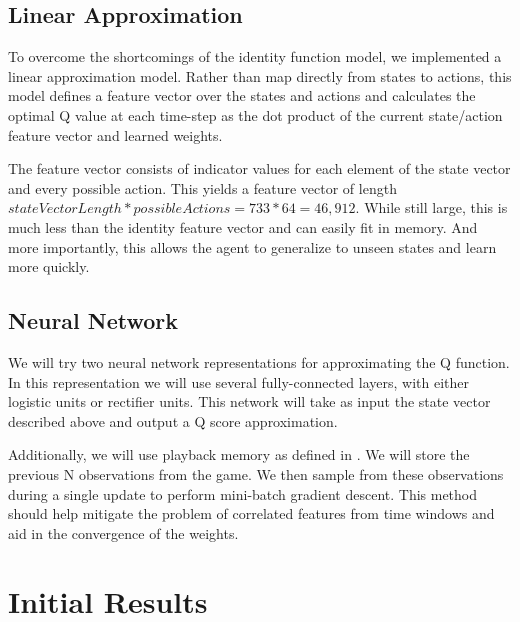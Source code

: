 \documentclass[12pt]{article}
\begin{document}
\subsection{Linear Approximation}

To overcome the shortcomings of the identity function model, we implemented a linear approximation model. Rather than map directly from states to actions, this model defines a feature vector over the states and actions and calculates the optimal Q value at each time-step as the dot product of the current state/action feature vector and learned weights. 

The feature vector consists of indicator values for each element of the state vector and every possible action. This yields a feature vector of length $stateVectorLength * possibleActions = 733 * 64 = 46,912$. While still large, this is much less than the identity feature vector and can easily fit in memory. And more importantly, this allows the agent to generalize to unseen states and learn more quickly.

\subsection{Neural Network}

We will try two neural network representations for approximating the Q function. In this representation we will use several fully-connected layers, with either logistic units or rectifier units. This network will take as input the state vector described above and output a Q score approximation.

Additionally, we will use playback memory as defined in \cite{mnih}. We will store the previous N observations from the game. We then sample from these observations during a single update to perform mini-batch gradient descent. This method should help mitigate the problem of correlated features from time windows and aid in the convergence of the weights.

\section{Initial Results}
\end{document}
